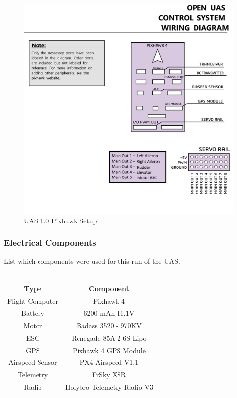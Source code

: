 \documentclass{article}
\begin{document}
\begin{figure}[H]
	\includegraphics[width = \columnwidth]{UAS_1_0_Pixhawk.jpg}
	\caption{UAS 1.0 Pixhawk Setup}
\end{figure}


\subsubsection*{Electrical Components}
List which components were used for this run of the UAS. \\ \\
\begin{tabular}{ c c }
	\textbf{Type} & \textbf{Component}  \\ 
	Flight Computer & Pixhawk 4 \\
	Battery & 6200 mAh 11.1V  \\  
	Motor & Badass 3520 - 970KV \\
	ESC & Renegade 85A 2-6S Lipo \\
	GPS & Pixhawk 4 GPS Module \\
	Airspeed Sensor & PX4 Airspeed V1.1 \\
	Telemetry &  FrSky X8R \\
	Radio & Holybro Telemetry Radio V3 \\
\end{tabular} \\
\end{document}
